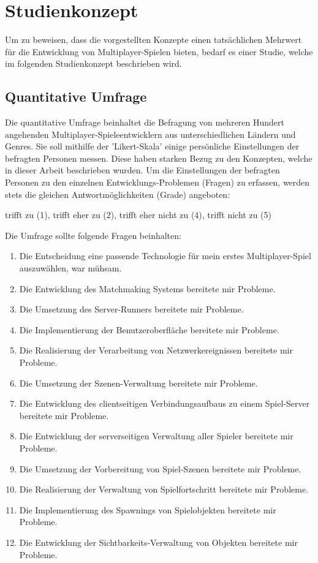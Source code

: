 \chapter{Studienkonzept}
\label{studienkonzept}

Um zu beweisen, dass die vorgestellten Konzepte einen tatsächlichen Mehrwert für die Entwicklung von Multiplayer-Spielen bieten, bedarf es einer Studie, welche im folgenden Studienkonzept beschrieben wird.

\section{Quantitative Umfrage}

Die quantitative Umfrage beinhaltet die Befragung von mehreren Hundert angehenden Multiplayer-Spieleentwicklern aus unterschiedlichen Ländern und Genres. Sie soll mithilfe der 'Likert-Skala' \cite{Wikipedia.2022d} einige persönliche Einstellungen der befragten Personen messen. Diese haben starken Bezug zu den Konzepten, welche in dieser Arbeit beschrieben wurden. Um die Einstellungen der befragten Personen zu den einzelnen Entwicklungs-Problemen (Fragen) zu erfassen, werden stets die gleichen Antwortmöglichkeiten (Grade) angeboten:

trifft zu (1), trifft eher zu (2), trifft eher nicht zu (4), trifft nicht zu (5)

Die Umfrage sollte folgende Fragen beinhalten:

\begin{enumerate}
	\item Die Entscheidung eine passende Technologie für mein erstes Multiplayer-Spiel auszuwählen, war mühsam.
	\item Die Entwicklung des Matchmaking Systems bereitete mir Probleme.
	\item Die Umsetzung des Server-Runners bereitete mir Probleme.
	\item Die Implementierung der Benutzeroberfläche bereitete mir Probleme.
	\item Die Realisierung der Verarbeitung von Netzwerkereignissen bereitete mir Probleme.
	\item Die Umsetzung der Szenen-Verwaltung bereitete mir Probleme.
	\item Die Entwicklung des clientseitigen Verbindungsaufbaus zu einem Spiel-Server bereitete mir Probleme.
	\item Die Entwicklung der serverseitigen Verwaltung aller Spieler bereitete mir Probleme.
	\item Die Umsetzung der Vorbereitung von Spiel-Szenen bereitete mir Probleme.
	\item Die Realisierung der Verwaltung von Spielfortschritt bereitete mir Probleme.
	\item Die Implementierung des Spawnings von Spielobjekten bereitete mir Probleme.
	\item Die Entwicklung der Sichtbarkeits-Verwaltung von Objekten bereitete mir Probleme.
\end{enumerate}

